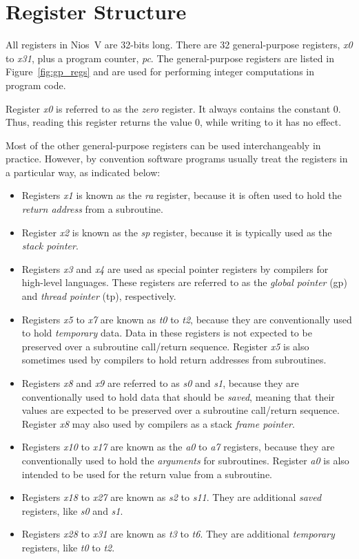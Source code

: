 \documentclass[11pt, twoside, pdftex]{article}
\begin{document}
\section{Register Structure}
\label{sec:registers}

All registers in Nios~V are 32-bits long. There are 32 general-purpose registers, 
{\it x0} to {\it x31}, plus a program counter, {\it pc}. The general-purpose registers
are listed in Figure~\ref{fig:gp_regs} 
and are used for performing integer computations in program code. 

Register {\it x0} is referred to as the {\it zero} register.  It always contains the 
constant 0. Thus, reading this register returns the value 0, while writing to it has no effect.  

Most of the other general-purpose registers can be used interchangeably in practice. However, 
by convention software programs usually treat the registers in a particular way, as indicated
below:

\begin{itemize}
\item Registers {\it x1} is known as the {\it ra} register, because it is often used
to hold the {\it return address} from a subroutine. 
\item Register {\it x2} is known as the {\it sp} register, because it is typically used 
as the {\it stack pointer}. 
\item Registers {\it x3} and {\it x4} are used as special pointer registers by compilers
for high-level languages. These registers are referred to as the {\it global pointer} (gp) and 
{\it thread pointer} (tp), respectively. 
\item Registers {\it x5} to {\it x7} are known as {\it t0} to {\it t2}, because they are
conventionally used to hold {\it temporary} data. Data in these registers is not expected 
to be preserved over a subroutine call/return sequence. Register {\it x5} is also sometimes 
used by compilers to hold return addresses from subroutines.
\item Registers {\it x8} and {\it x9} are referred to as {\it s0} and {\it s1}, because 
they are conventionally used to hold data that should be {\it saved}, meaning that their 
values are expected to be preserved over a subroutine call/return sequence.
Register {\it x8} may also used by compilers as a stack {\it frame pointer}.
\item Registers {\it x10} to {\it x17} are known as the {\it a0} to {\it a7} registers, 
because they are conventionally used to hold the {\it arguments} for subroutines. 
Register {\it a0} is also intended to be used for the return value from a subroutine. 
\item Registers {\it x18} to {\it x27} are known as {\it s2} to {\it s11}. They are
additional {\it saved} registers, like {\it s0} and {\it s1}.
\item Registers {\it x28} to {\it x31} are known as {\it t3} to {\it t6}. They are
additional {\it temporary} registers, like {\it t0} to {\it t2}. 
\end{itemize}
\end{document}
